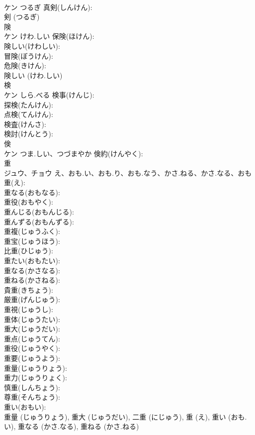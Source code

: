 \documentclass[8pt]{extreport}
\begin{document}
\begin{CJK}{UTF8}{min}
\\	ケン	つるぎ	真剣(しんけん): 
\\	剣 (つるぎ)
\\	険			
\\	ケン	けわ.しい	保険(ほけん): 
\\	険しい(けわしい): 
\\	冒険(ぼうけん): 
\\	危険(きけん): 
\\	険しい (けわ.しい)
\\	検			
\\	ケン	しら.べる	検事(けんじ): 
\\	探検(たんけん): 
\\	点検(てんけん): 
\\	検査(けんさ): 
\\	検討(けんとう): 
\\	倹			
\\	ケン	つま.しい、つづまやか	倹約(けんやく): 
\\	重			
\\	ジュウ、チョウ	え、おも.い、おも.り、おも.なう、かさ.ねる、かさ.なる、おも	重(え): 
\\	重なる(おもなる): 
\\	重役(おもやく): 
\\	重んじる(おもんじる): 
\\	重んずる(おもんずる): 
\\	重複(じゅうふく): 
\\	重宝(じゅうほう): 
\\	比重(ひじゅう): 
\\	重たい(おもたい): 
\\	重なる(かさなる): 
\\	重ねる(かさねる): 
\\	貴重(きちょう): 
\\	厳重(げんじゅう): 
\\	重視(じゅうし): 
\\	重体(じゅうたい): 
\\	重大(じゅうだい): 
\\	重点(じゅうてん): 
\\	重役(じゅうやく): 
\\	重要(じゅうよう): 
\\	重量(じゅうりょう): 
\\	重力(じゅうりょく): 
\\	慎重(しんちょう): 
\\	尊重(そんちょう): 
\\	重い(おもい): 
\\	重量 (じゅうりょう), 重大 (じゅうだい), 二重 (にじゅう), 重 (え), 重い (おも.い), 重なる (かさ.なる), 重ねる (かさ.ねる)

\end{CJK}
\end{document}
